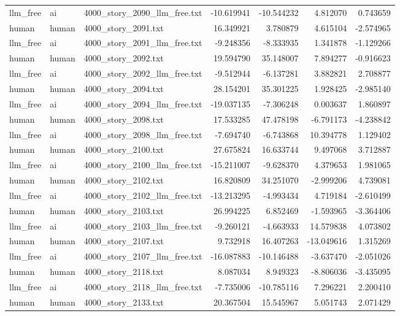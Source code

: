 \begin{longtable}{lllrrrr}
llm\_free & ai & 4000\_story\_2090\_llm\_free.txt & -10.619941 & -10.544232 & 4.812070 & 0.743659 \\
human & human & 4000\_story\_2091.txt & 16.349921 & 3.780879 & 4.615104 & -2.574965 \\
llm\_free & ai & 4000\_story\_2091\_llm\_free.txt & -9.248356 & -8.333935 & 1.341878 & -1.129266 \\
human & human & 4000\_story\_2092.txt & 19.594790 & 35.148007 & 7.894277 & -0.916623 \\
llm\_free & ai & 4000\_story\_2092\_llm\_free.txt & -9.512944 & -6.137281 & 3.882821 & 2.708877 \\
human & human & 4000\_story\_2094.txt & 28.154201 & 35.301225 & 1.928425 & -2.985140 \\
llm\_free & ai & 4000\_story\_2094\_llm\_free.txt & -19.037135 & -7.306248 & 0.003637 & 1.860897 \\
human & human & 4000\_story\_2098.txt & 17.533285 & 47.478198 & -6.791173 & -4.238842 \\
llm\_free & ai & 4000\_story\_2098\_llm\_free.txt & -7.694740 & -6.743868 & 10.394778 & 1.129402 \\
human & human & 4000\_story\_2100.txt & 27.675824 & 16.633744 & 9.497068 & 3.712887 \\
llm\_free & ai & 4000\_story\_2100\_llm\_free.txt & -15.211007 & -9.628370 & 4.379653 & 1.981065 \\
human & human & 4000\_story\_2102.txt & 16.820809 & 34.251070 & -2.999206 & 4.739081 \\
llm\_free & ai & 4000\_story\_2102\_llm\_free.txt & -13.213295 & -4.993434 & 4.719184 & -2.610499 \\
human & human & 4000\_story\_2103.txt & 26.994225 & 6.852469 & -1.593965 & -3.364406 \\
llm\_free & ai & 4000\_story\_2103\_llm\_free.txt & -9.260121 & -4.663933 & 14.579838 & 4.073802 \\
human & human & 4000\_story\_2107.txt & 9.732918 & 16.407263 & -13.049616 & 1.315269 \\
llm\_free & ai & 4000\_story\_2107\_llm\_free.txt & -16.087883 & -10.146488 & -3.637470 & -2.051026 \\
human & human & 4000\_story\_2118.txt & 8.087034 & 8.949323 & -8.806036 & -3.435095 \\
llm\_free & ai & 4000\_story\_2118\_llm\_free.txt & -7.735006 & -10.785116 & 7.296221 & 2.200410 \\
human & human & 4000\_story\_2133.txt & 20.367504 & 15.545967 & 5.051743 & 2.071429 \\

\end{longtable}
